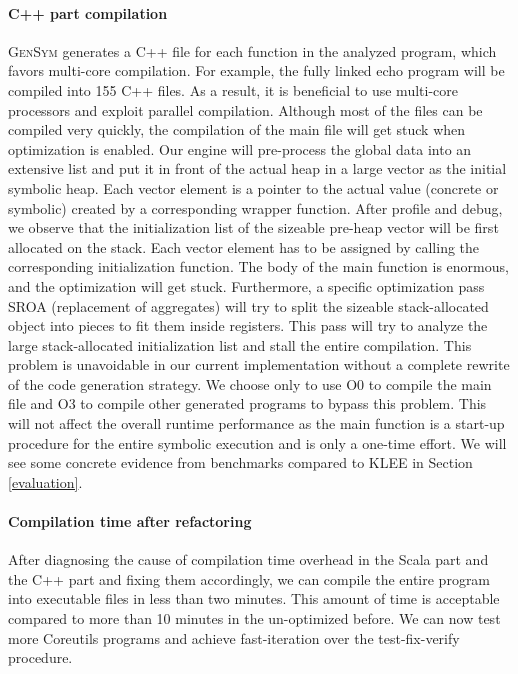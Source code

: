 \documentclass[sigplan, nonacm]{acmart}\settopmatter{printfolios=true,printccs=false,printacmref=false}
\newcommand{\tool}{\textsc{GenSym}\xspace}
\begin{document}
\paragraph*{C++ part compilation}
\tool generates a C++ file for each function in the analyzed program, which favors multi-core compilation. For example, the fully linked echo program will be compiled into 155 C++ files. As a result, it is beneficial to use multi-core processors and exploit parallel compilation. Although most of the files can be compiled very quickly, the compilation of the main file will get stuck when optimization is enabled. Our engine will pre-process the global data into an extensive list and put it in front of the actual heap in a large vector as the initial symbolic heap. Each vector element is a pointer to the actual value (concrete or symbolic) created by a corresponding wrapper function. After profile and debug, we observe that the initialization list of the sizeable pre-heap vector will be first allocated on the stack. Each vector element has to be assigned by calling the corresponding initialization function. The body of the main function is enormous, and the optimization will get stuck. Furthermore, a specific optimization pass SROA (replacement of aggregates) will try to split the sizeable stack-allocated object into pieces to fit them inside registers. This pass will try to analyze the large stack-allocated initialization list and stall the entire compilation. This problem is unavoidable in our current implementation without a complete rewrite of the code generation strategy. We choose only to use O0 to compile the main file and O3 to compile other generated programs to bypass this problem. This will not affect the overall runtime performance as the main function is a start-up procedure for the entire symbolic execution and is only a one-time effort. We will see some concrete evidence from benchmarks compared to KLEE in Section \ref{evaluation}.
\paragraph*{Compilation time after refactoring}
After diagnosing the cause of compilation time overhead in the Scala part and the C++ part and fixing them accordingly, we can compile the entire program into executable files in less than two minutes. This amount of time is acceptable compared to more than 10 minutes in the un-optimized before. We can now test more Coreutils programs and achieve fast-iteration over the test-fix-verify procedure.
\end{document}
